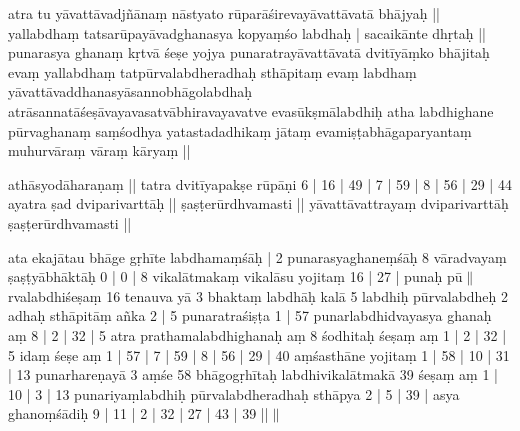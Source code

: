 \documentclass[10pt]{article}
\begin{document}
atra tu   yāvattāvadjñānaṃ nāstyato rūparāśirevayāvattāvatā bhājyaḥ || 
yallabdhaṃ   tatsarūpayāvadghanasya kopyaṃśo labdhaḥ | 
sacaikānte dhṛtaḥ || punarasya ghanaṃ kṛtvā śeṣe 
  yojya punaratrayāvattāvatā dvitīyāṃko bhājitaḥ evaṃ yallabdhaṃ tatpūrvalabdheradhaḥ sthāpitaṃ evaṃ labdhaṃ yāvattāvaddhanasyāsannobhāgolabdhaḥ 
  atrāsannatāśeṣāvayavasatvābhiravayavatve evasūkṣmālabdhiḥ atha labdhighane pūrvaghanaṃ 
  saṃśodhya yatastadadhikaṃ jātaṃ evamiṣṭabhāgaparyantaṃ muhurvāraṃ vāraṃ kāryaṃ || 

athāsyodāharaṇaṃ || 
tatra dvitīyapakṣe rūpāṇi 6 |  16 | 49 | 7 | 59 | 8 | 56 | 29 | 44 ayatra ṣad 
  dviparivarttāḥ || 
ṣaṣṭerūrdhvamasti || 
yāvattāvattrayaṃ dviparivarttāḥ ṣaṣṭerūrdhvamasti || 

ata  ekajātau bhāge gṛhīte labdhamaṃśāḥ | 2 punarasyaghaneṃśāḥ 8 vāradvayaṃ ṣaṣṭyābhāktāḥ 0 | 
  0 | 8 vikalātmakaṃ vikalāsu yojitaṃ 16 | 27 | punaḥ pū$\|$
rvalabdhiśeṣaṃ 16 
  tenauva yā 3 bhaktaṃ labdhāḥ kalā 5 labdhiḥ pūrvalabdheḥ 2 adhaḥ sthāpitāṃ añka 2 | 5 
  punaratraśiṣṭa 1 | 57 punarlabdhidvayasya ghanaḥ aṃ 8 | 2 | 32 | 5 
atra prathamalabdhighanaḥ aṃ 8 
  śodhitaḥ śeṣaṃ aṃ 1 | 2 | 32 | 5 idaṃ śeṣe aṃ 1 | 57 | 7 | 59 | 8 | 56 | 29 | 40 aṃśasthāne yojitaṃ 
  1 | 58 | 10 | 31 | 13  punarhareṇayā 3 aṃśe 58 bhāgogṛhītaḥ labdhivikalātmakā 39 śeṣaṃ aṃ 1 | 10 | 3 | 13  punariyaṃlabdhiḥ pūrvalabdheradhaḥ sthāpya 2 | 5 | 
  39 | asya ghanoṃśādiḥ 9 | 11 | 2 | 32 | 27 | 43 | 39 ||$\|$
  
\end{document}
